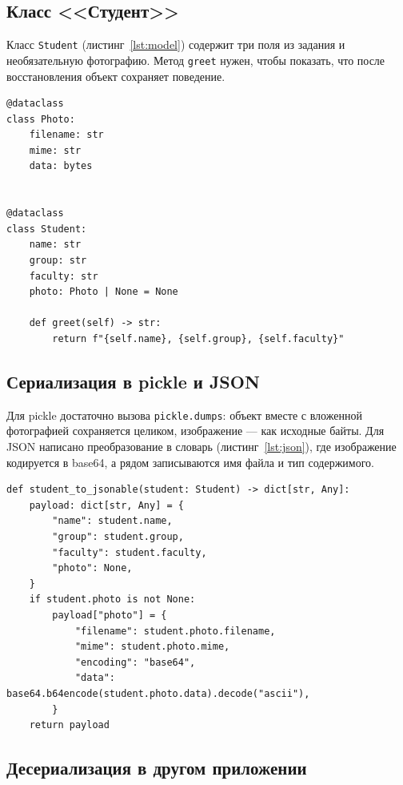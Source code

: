 \documentclass[14pt,a4paper]{extarticle}
\begin{document}
\subsection{Класс <<Студент>>}

Класс \texttt{Student} (листинг~\ref{lst:model}) содержит три поля из задания и
необязательную фотографию. Метод \texttt{greet} нужен, чтобы показать, что после
восстановления объект сохраняет поведение.

\begin{lstlisting}[style=python, caption={Классы предметной области}, label={lst:model}]
@dataclass
class Photo:
    filename: str
    mime: str
    data: bytes


@dataclass
class Student:
    name: str
    group: str
    faculty: str
    photo: Photo | None = None

    def greet(self) -> str:
        return f"{self.name}, {self.group}, {self.faculty}"
\end{lstlisting}

\subsection{Сериализация в pickle и JSON}

Для pickle достаточно вызова \texttt{pickle.dumps}: объект вместе с вложенной
фотографией сохраняется целиком, изображение --- как исходные байты. Для JSON написано
преобразование в словарь (листинг~\ref{lst:json}), где изображение кодируется в base64,
а рядом записываются имя файла и тип содержимого.

\begin{lstlisting}[style=python, caption={Преобразование объекта для JSON}, label={lst:json}]
def student_to_jsonable(student: Student) -> dict[str, Any]:
    payload: dict[str, Any] = {
        "name": student.name,
        "group": student.group,
        "faculty": student.faculty,
        "photo": None,
    }
    if student.photo is not None:
        payload["photo"] = {
            "filename": student.photo.filename,
            "mime": student.photo.mime,
            "encoding": "base64",
            "data": base64.b64encode(student.photo.data).decode("ascii"),
        }
    return payload
\end{lstlisting}

\subsection{Десериализация в другом приложении}
\end{document}
